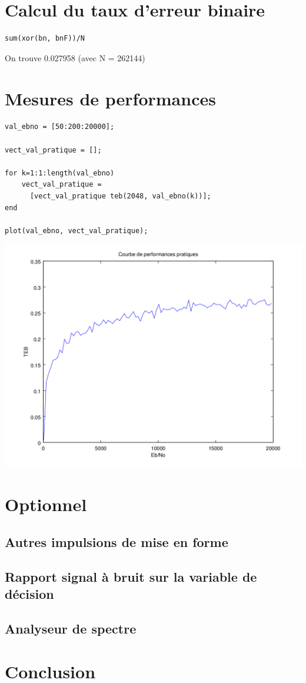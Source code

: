 \documentclass{acm_proc_article-sp}
\begin{document}
\section{Calcul du taux d'erreur binaire}

\begin{lstlisting}
sum(xor(bn, bnF))/N
\end{lstlisting}

On trouve 0.027958 (avec N = 262144)

\section{Mesures de performances}


\begin{center}
\begin{lstlisting}
val_ebno = [50:200:20000];

vect_val_pratique = [];

for k=1:1:length(val_ebno)
    vect_val_pratique = 
      [vect_val_pratique teb(2048, val_ebno(k))];
end

plot(val_ebno, vect_val_pratique);
\end{lstlisting}

\includegraphics[scale=0.45]{performance_prat_8.png}
\end{center}

\section{Optionnel}
\subsection{Autres impulsions de mise en forme}
\subsection{Rapport signal à bruit sur la variable de décision}
\subsection{Analyseur de spectre}


\section{Conclusion}


\nocite{*}

\balancecolumns
\end{document}
